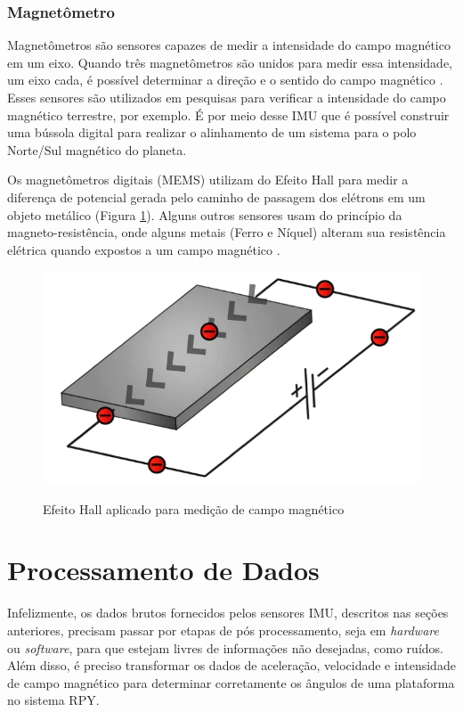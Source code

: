 \subsubsection{Magnetômetro}
Magnetômetros são sensores capazes de medir a intensidade do campo magnético em um eixo. Quando três magnetômetros são unidos para medir essa intensidade, um eixo cada, é possível determinar a direção e o sentido do campo magnético \cite{tcc:rafaelEESC}. Esses sensores são utilizados em pesquisas para verificar a intensidade do campo magnético terrestre, por exemplo. É por meio desse IMU que é possível construir uma bússola digital para realizar o alinhamento de um sistema para o polo Norte/Sul magnético do planeta.

Os magnetômetros digitais (MEMS) utilizam do Efeito Hall para medir a diferença de potencial gerada pelo caminho de passagem dos elétrons em um objeto metálico (Figura \ref{fig:memnsmag}). Alguns outros sensores usam do princípio da magneto-resistência, onde alguns metais (Ferro e Níquel) alteram sua resistência elétrica quando expostos a um campo magnético \cite{site:MEMSHOTO}.

\begin{figure}[!htb]
	\centering
	\caption{Efeito Hall aplicado para medição de campo magnético}
	\includegraphics[width=0.7\linewidth]{figuras/revisaobiblio/memnsmag}
	\label{fig:memnsmag}
\end{figure}


\section{Processamento de Dados}

Infelizmente, os dados brutos fornecidos pelos sensores IMU, descritos nas seções anteriores, precisam passar por etapas de pós processamento, seja em \textit{hardware} ou \textit{software}, para que estejam livres de informações não desejadas, como ruídos. Além disso, é preciso transformar os dados de aceleração, velocidade e intensidade de campo magnético para determinar corretamente os ângulos de uma plataforma no sistema RPY. 

